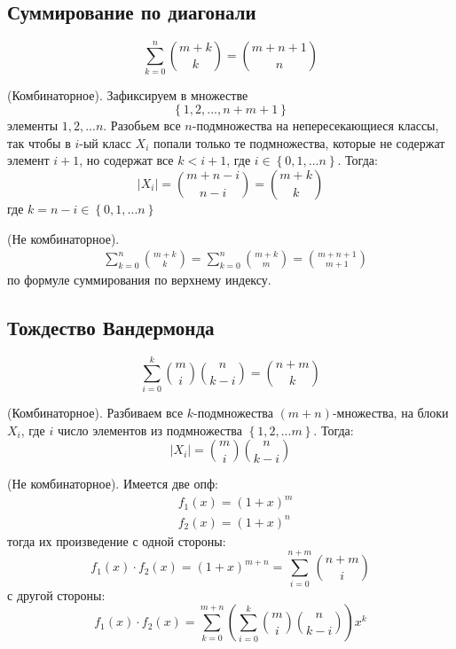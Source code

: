 \subsection{Суммирование по диагонали}
\begin{equation}
\sum_{k=0}^n\binom{m+k}{k} = \binom{m+n+1}{n}
\end{equation}
\begin{Proof} (Комбинаторное). Зафиксируем в множестве $$ \left\{1, 2, ..., n+m+1\right\} $$ элементы $1, 2, ... n$. Разобьем все $n$-подмножества на непересекающиеся классы, так чтобы в $i$-ый класс $X_i$ попали только те подмножества, которые не содержат элемент $i+1$, но содержат все $k < i+1$, где $i \in \left\{0, 1, ... n\right\}$. Тогда:
\[
	\left|X_i\right| = \binom{m+n-i}{n-i} = \binom{m+k}{k}
\]
где $k = n-i \in \left\{0, 1, ... n\right\}$
\end{Proof}
\begin{Proof} (Не комбинаторное).
\[
	\begin{split}
		& \sum_{k=0}^n\binom{m+k}{k} = \sum_{k=0}^n\binom{m+k}{m} = \binom{m + n + 1}{m + 1}
	\end{split}	
\]
по формуле суммирования по верхнему индексу.
\end{Proof}
\subsection{Тождество Вандермонда}
\begin{equation}
\sum_{i=0}^k\binom{m}{i}\binom{n}{k-i} = \binom{n+m}{k}
\end{equation}
\begin{Proof} (Комбинаторное). Разбиваем все $k$-подмножества $\left(m+n\right)$-множества, на блоки $X_i$, где $i$ число элементов из подмножества $\left\{1, 2, ... m\right\}$. Тогда:
\[
	\left|X_i\right| = \binom{m}{i}\binom{n}{k-i}
\]
\end{Proof}
\begin{Proof} (Не комбинаторное). Имеется две опф:
\[
	\begin{split}
		& f_1\left(x\right) = \left(1+x\right)^m \\
		& f_2\left(x\right) = \left(1+x\right)^n
	\end{split}
\]
тогда их произведение с одной стороны:
\[
	f_1\left(x\right)\cdot f_2\left(x\right) = \left(1+x\right)^{m+n} = \sum_{i=0}^{n+m}\binom{n+m}{i}
\]
с другой стороны:
\[
	f_1\left(x\right)\cdot f_2\left(x\right) = \sum_{k=0}^{m+n} \left(\sum_{i=0}^k \binom{m}{i}\binom{n}{k-i}\right) x^k
\]
\end{Proof}
